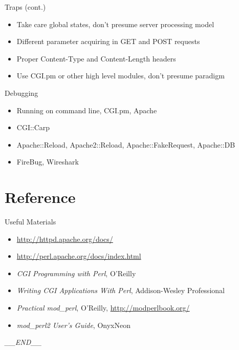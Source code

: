 \documentclass{beamer}
\begin{document}
\begin{frame}{Traps (cont.)}
  \begin{itemize}
    \item Take care global states, don't presume server processing model
    \item Different parameter acquiring in GET and POST requests
    \item Proper Content-Type and Content-Length headers
    \item Use CGI.pm or other high level modules, don't presume paradigm
  \end{itemize}
\end{frame}

\begin{frame}{Debugging}
  \begin{itemize}
    \item Running on command line, CGI.pm, Apache
    \item CGI::Carp
    \item Apache::Reload, Apache2::Reload, Apache::FakeRequest, Apache::DB
    \item FireBug, Wireshark
  \end{itemize}
\end{frame}

\section{Reference}

\begin{frame}{Useful Materials}
  \begin{itemize}
    \item \href{http://httpd.apache.org/docs/}{http://httpd.apache.org/docs/}
    \item \href{http://perl.apache.org/docs/index.html}{http://perl.apache.org/docs/index.html}
    \item \emph{CGI Programming with Perl}, O'Reilly
    \item \emph{Writing CGI Applications With Perl}, Addison-Wesley Professional
    \item \emph{Practical mod\_perl}, O'Reilly, \href{http://modperlbook.org/}{http://modperlbook.org/}
    \item \emph{mod\_perl2 User's Guide}, OnyxNeon
  \end{itemize}
\end{frame}

\begin{frame}
  \begin{center}
    {\sl \_\_END\_\_}
  \end{center}
\end{frame}
\end{document}
